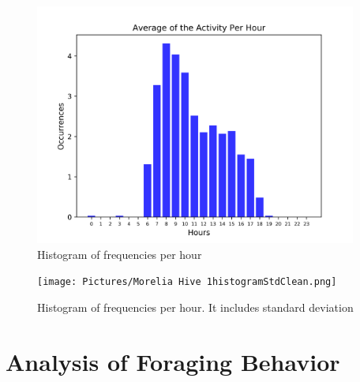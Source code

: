 \documentclass[11pt,fleqn]{book} %
\begin{document}
\begin{figure}[h!]%
\centering%
\includegraphics[width=400px]{Pictures/Morelia Hive 1histogramClean.png}%
\caption{Histogram of frequencies per hour}%
\end{figure}

%


\begin{figure}[h!]%
\centering%
\texttt{[image: Pictures/Morelia Hive 1histogramStdClean.png]}%
\caption{Histogram of frequencies per hour. It includes standard deviation}%
\end{figure}

\chapter{Analysis of Foraging Behavior}
\end{document}
